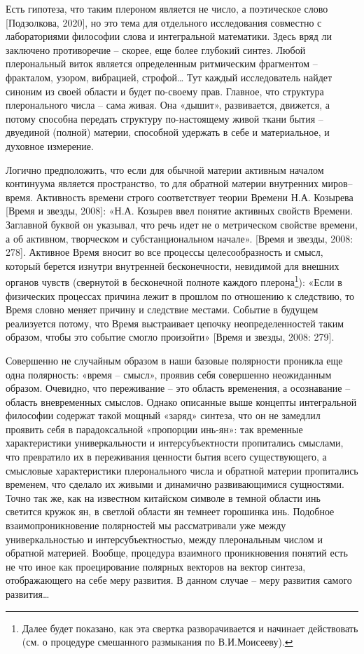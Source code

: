    Есть гипотеза, что таким плероном является не число, а поэтическое слово [Подзолкова, 2020], но это тема для отдельного исследования совместно с лабораториями философии слова и интегральной математики. Здесь вряд ли заключено противоречие – скорее, еще более глубокий синтез. Любой плерональный виток является определенным ритмическим фрагментом – фракталом, узором, вибрацией, строфой… Тут каждый исследователь найдет синоним из своей области и будет по-своему прав. Главное, что структура плеронального числа – сама живая. Она «дышит», развивается, движется, а потому способна передать структуру по-настоящему живой ткани бытия – двуединой (полной) материи, способной удержать в себе и материальное, и духовное измерение.

    Логично предположить, что если для обычной материи активным началом континуума является пространство, то для обратной материи внутренних миров– время. Активность времени строго соответствует теории Времени Н.А. Козырева [Время и звезды, 2008]: «Н.А. Козырев ввел понятие активных свойств Времени. Заглавной буквой он указывал, что речь идет не о метрическом свойстве времени, а об активном, творческом и субстанциональном начале». [Время и звезды, 2008: 278]. Активное Время вносит во все процессы целесообразность и смысл, который берется изнутри внутренней бесконечности, невидимой для внешних органов чувств (свернутой в бесконечной полноте каждого плерона\footnote{Далее будет показано, как эта свертка разворачивается и начинает действовать (см. о процедуре смешанного размыкания по В.И.Моисееву).}): «Если в физических процессах причина лежит в прошлом по отношению к следствию, то Время словно меняет причину и следствие местами. Событие в будущем реализуется потому, что Время выстраивает цепочку неопределенностей таким образом, чтобы это событие смогло произойти» [Время и звезды, 2008: 279].

    Совершенно не случайным образом в наши базовые полярности проникла еще одна полярность: «время – смысл», проявив себя совершенно неожиданным образом. Очевидно, что переживание – это область временения, а осознавание – область вневременных смыслов. Однако описанные выше концепты интегральной философии содержат такой мощный «заряд» синтеза, что он не замедлил проявить себя в парадоксальной «пропорции инь-ян»: так временные характеристики универкальности и интерсубъектности пропитались смыслами, что превратило их в переживания ценности бытия всего существующего, а смысловые характеристики плеронального числа и обратной материи пропитались временем, что сделало их живыми и динамично развивающимися сущностями. Точно так же, как на известном китайском символе в темной области инь светится кружок ян, в светлой области ян темнеет горошинка инь. Подобное взаимопроникновение полярностей мы рассматривали уже между универкальностью и интерсубъектностью, между плерональным числом и обратной материей. Вообще, процедура взаимного проникновения понятий есть не что иное как проецирование полярных векторов на вектор синтеза, отображающего на себе меру развития. В данном случае – меру развития самого развития…

